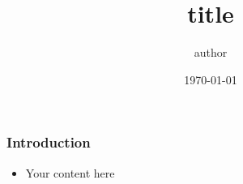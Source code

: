 \documentclass{beamer}
\title{{{title}}}
\author{{{author}}}
\date{\today}
\begin{document}
\frame{\titlepage}

\begin{frame}
\frametitle{Introduction}
\begin{itemize}
\item Your content here
\end{itemize}
\end{frame}
\end{document}
